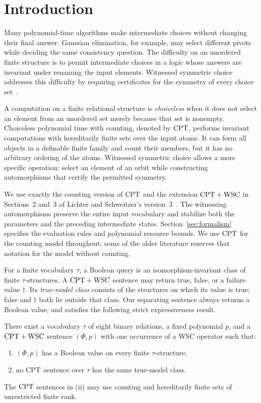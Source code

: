 \section{Introduction}\label{sec:introduction}

Many polynomial-time algorithms make intermediate choices without changing
their final answer. Gaussian elimination, for example, may select different
pivots while deciding the same consistency question. The difficulty on an
unordered finite structure is to permit intermediate choices in a logic
whose answers are invariant under renaming the input elements. Witnessed symmetric
choice addresses this difficulty by requiring certificates for the
symmetry of every choice set~\cite[Introduction]{ls2023}.

A computation on a finite relational structure is \emph{choiceless} when it
does not select an element from an unordered set merely because that set is
nonempty. Choiceless polynomial time with counting, denoted by \(\mathrm{CPT}\),
performs invariant computations with hereditarily finite sets over the input
atoms. It can form all objects in a definable finite family and count their
members, but it has no arbitrary ordering of the atoms. Witnessed symmetric
choice allows a more specific operation: select an element of an orbit while
constructing automorphisms that certify the permitted symmetry.

We use exactly the counting version of \(\mathrm{CPT}\) and the extension
\(\mathrm{CPT}+\mathrm{WSC}\) in Sections~2 and~3 of Lichter and Schweitzer's
version~3~\cite{ls2023}. The witnessing automorphisms preserve
the entire input vocabulary and stabilize both the parameters and the
preceding intermediate states. Section~\ref{sec:formalism} specifies the
evaluation rules and polynomial resource bounds. We use \(\mathrm{CPT}\) for the
counting model throughout; some of the older literature reserves that
notation for the model without counting.

For a finite vocabulary \(\tau\), a Boolean query is an isomorphism-invariant
class of finite \(\tau\)-structures. A \(\mathrm{CPT}+\mathrm{WSC}\) sentence may return
true, false, or a failure value \(\dagger\). Its \emph{true-model class}
consists of the structures on which its value is true; false and
\(\dagger\) both lie outside that class. Our separating sentence always
returns a Boolean value, and satisfies the following strict
expressiveness result.

\begin{theorem}\label{thm:main}
There exist a vocabulary \(\tau\) of eight binary relations, a fixed polynomial
\(p\), and a \(\mathrm{CPT}+\mathrm{WSC}\) sentence \((\Phi,p)\) with one occurrence of a WSC
operator such that:
\begin{enumerate}[label=\textup{(\roman*)}]
\item \((\Phi,p)\) has a Boolean value on every finite \(\tau\)-structure;
\item no \(\mathrm{CPT}\) sentence over \(\tau\) has the same true-model class.
\end{enumerate}
The \(\mathrm{CPT}\) sentences in \textup{(ii)} may use counting and hereditarily
finite sets of unrestricted finite rank.
\end{theorem}

